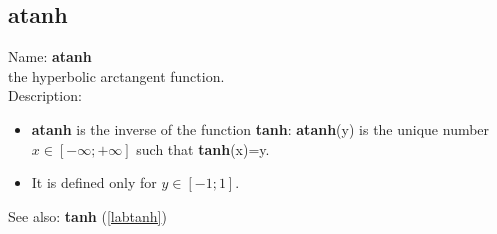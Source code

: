 \subsection{atanh}
\label{labatanh}
\noindent Name: \textbf{atanh}\\
the hyperbolic arctangent function.\\
\noindent Description: \begin{itemize}

\item \textbf{atanh} is the inverse of the function \textbf{tanh}: \textbf{atanh}(y) is the unique number 
   $x \in [-\infty; +\infty]$ such that \textbf{tanh}(x)=y.

\item It is defined only for $y \in [-1; 1]$.
\end{itemize}
See also: \textbf{tanh} (\ref{labtanh})
